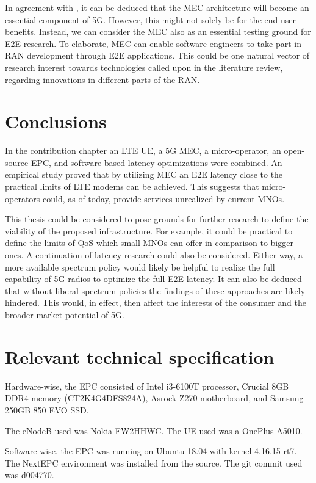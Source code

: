\documentclass[12pt]{article}
\begin{document}
In agreement with \cite{saguna-intel2016}, it can be deduced that the \gls{MEC} architecture will become an essential component of \gls{5G}. However, this might not solely be for the end-user benefits. Instead, we can consider the \gls{MEC} also as an essential testing ground for \gls{E2E} research. To elaborate, \gls{MEC} can enable software engineers to take part in \gls{RAN} development through \gls{E2E} applications. This could be one natural vector of research interest towards technologies called upon in the literature review, regarding innovations in different parts of the \gls{RAN}.

\newpage

\section{Conclusions}

In the contribution chapter an \gls{LTE} \gls{UE}, a \gls{5G} \gls{MEC}, a micro-operator, an open-source \gls{EPC}, and software-based latency optimizations were combined. An empirical study proved that by utilizing \gls{MEC} an \gls{E2E} latency close to the practical limits of \gls{LTE} modems can be achieved. This suggests that micro-operators could, as of today, provide services unrealized by current \glspl{MNO}.

This thesis could be considered to pose grounds for further research to define the viability of the proposed infrastructure. For example, it could be practical to define the limits of \gls{QoS} which small \glspl{MNO} can offer in comparison to bigger ones. A continuation of latency research could also be considered. Either way, a more available spectrum policy would likely be helpful to realize the full capability of \gls{5G} radios to optimize the full \gls{E2E} latency. It can also be deduced that without liberal spectrum policies the findings of these approaches are likely hindered. This would, in effect, then affect the interests of the consumer and the broader market potential of \gls{5G}.

\newpage
\appendix
\newpage

\section{Relevant technical specification}
\label{ch:hardware}

Hardware-wise, the EPC consisted of Intel i3-6100T processor, Crucial 8GB DDR4 memory (CT2K4G4DFS824A), Asrock Z270 motherboard, and Samsung 250GB 850 EVO SSD.

The eNodeB used was Nokia FW2HHWC. The \gls{UE} used was a OnePlus A5010.

Software-wise, the EPC was running on Ubuntu 18.04 with kernel 4.16.15-rt7. The NextEPC environment was installed from the source. The git commit used was d004770.

\newpage

 
\end{document}
